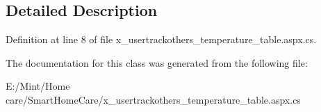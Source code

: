 \subsection{Detailed Description}


Definition at line 8 of file x\-\_\-usertrackothers\-\_\-temperature\-\_\-table.\-aspx.\-cs.



The documentation for this class was generated from the following file\-:\begin{DoxyCompactItemize}
\item 
E\-:/\-Mint/\-Home care/\-Smart\-Home\-Care/x\-\_\-usertrackothers\-\_\-temperature\-\_\-table.\-aspx.\-cs\end{DoxyCompactItemize}
